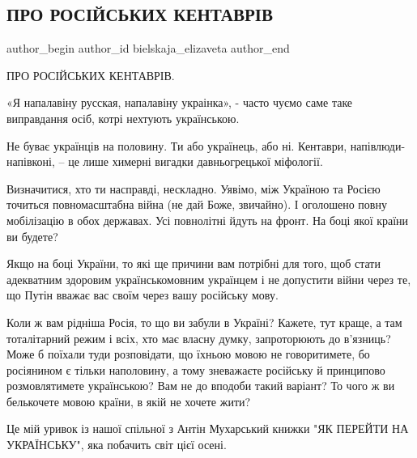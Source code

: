 
 
 
 
 
 
\subsection{ПРО РОСІЙСЬКИХ КЕНТАВРІВ}
\label{sec:30_07_2021.fb.bielskaja_elizaveta.1.ros_kentavry}
 
\ifcmt
 author_begin
   author_id bielskaja_elizaveta
 author_end
\fi

ПРО РОСІЙСЬКИХ КЕНТАВРІВ.

«Я напалавіну русская, напалавіну украінка», - часто чуємо саме таке виправдання осіб, котрі нехтують українською. 

Не буває українців на половину. Ти або українець, або ні. Кентаври,
напівлюди-напівконі, – це лише химерні вигадки давньогрецької міфології. 

Визначитися, хто ти насправді, нескладно. Уявімо, між Україною та Росією
точиться повномасштабна війна (не дай Боже, звичайно). І оголошено повну
мобілізацію в обох державах. Усі повнолітні йдуть на фронт. На боці якої країни
ви будете? 

Якщо на боці України, то які ще причини вам потрібні для того, щоб стати
адекватним здоровим українськомовним українцем і не допустити війни через те,
що Путін вважає вас своїм через вашу російську мову. 

Коли ж вам рідніша Росія, то що ви забули в Україні? Кажете, тут краще, а там
тоталітарний режим і всіх, хто має власну думку, запроторюють до в’язниць? Може
б поїхали туди розповідати, що їхньою мовою не говоритимете, бо росіянином є
тільки наполовину, а тому зневажаєте російську й принципово розмовлятимете
українською? Вам не до вподоби такий варіант? То чого ж ви белькочете мовою
країни, в якій не хочете жити? 

Це мій уривок із нашої спільної з Антін Мухарський книжки "ЯК ПЕРЕЙТИ НА
УКРАЇНСЬКУ", яка побачить світ цієї осені.

